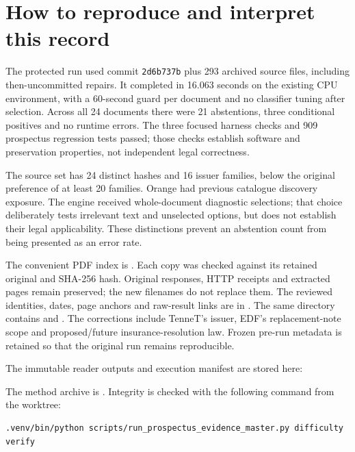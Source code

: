 \documentclass[12pt,a4paper,oneside,openany]{book}
\begin{document}
\section{How to reproduce and interpret this record}

The protected run used commit \texttt{2d6b737b} plus 293 archived source files,
including then-uncommitted repairs. It completed in 16.063 seconds on the
existing CPU environment, with a 60-second guard per document and no
classifier tuning after selection. Across all 24 documents there were
21 abstentions, three conditional positives and no runtime errors. The
three focused harness checks and 909 prospectus regression tests passed;
those checks establish software and preservation properties, not independent
legal correctness.

The source set has 24 distinct hashes and 16 issuer families, below the
original preference of at least 20 families. Orange had previous catalogue
discovery exposure. The engine received whole-document diagnostic selections;
that choice deliberately tests irrelevant text and unselected options, but
does not establish their legal applicability. These distinctions prevent an
abstention count from being presented as an error rate.

The convenient PDF index is
.
Each copy was checked against its retained original and SHA-256 hash.
Original responses, HTTP receipts and extracted pages remain preserved;
the new filenames do not replace them. The reviewed identities, dates,
page anchors and raw-result links are in
.
The same directory contains  and
. The corrections include TenneT's issuer, EDF's
replacement-note scope and proposed/future insurance-resolution law.
Frozen pre-run metadata is retained so that the original run remains
reproducible.

The immutable reader outputs and execution manifest are stored here:
\begin{quote}\small
{}
\end{quote}
The method archive is .
Integrity is checked with the following command from the worktree:

\begin{lstlisting}
.venv/bin/python scripts/run_prospectus_evidence_master.py difficulty verify
\end{lstlisting}
\end{document}
